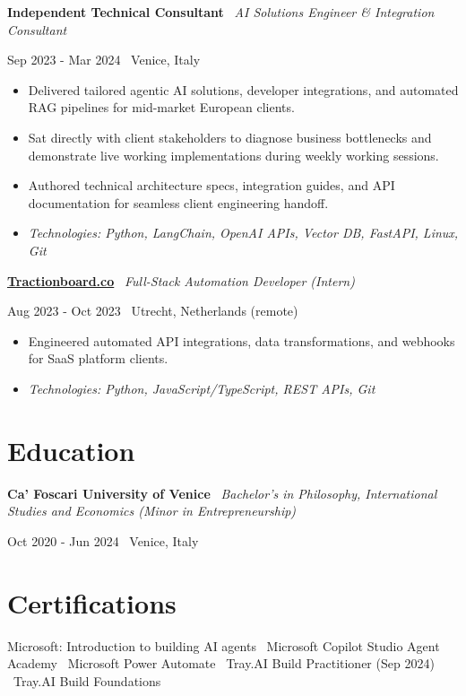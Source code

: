 \documentclass[a4paper,10pt]{article}
\newcommand{\role}[4]{%
  \vspace{2pt}\noindent
  \begin{minipage}[t]{0.70\textwidth}\raggedright\textbf{#1} \textbullet\ \textit{#3}\end{minipage}%
  \hfill
  \begin{minipage}[t]{0.28\textwidth}\raggedleft\footnotesize\color{gray}#2 \textbullet\ #4\end{minipage}%
  \vspace{1pt}%
}
\begin{document}
\role{Independent Technical Consultant}{Sep 2023 - Mar 2024}{AI Solutions Engineer \& Integration Consultant}{Venice, Italy}
\begin{itemize}
  \item Delivered tailored agentic AI solutions, developer integrations, and automated RAG pipelines for mid-market European clients.
  \item Sat directly with client stakeholders to diagnose business bottlenecks and demonstrate live working implementations during weekly working sessions.
  \item Authored technical architecture specs, integration guides, and API documentation for seamless client engineering handoff.
  \item \textit{Technologies: Python, LangChain, OpenAI APIs, Vector DB, FastAPI, Linux, Git}
\end{itemize}

\role{\href{https://tractionboard.co}{Tractionboard.co}}{Aug 2023 - Oct 2023}{Full-Stack Automation Developer (Intern)}{Utrecht, Netherlands (remote)}
\begin{itemize}
  \item Engineered automated API integrations, data transformations, and webhooks for SaaS platform clients.
  \item \textit{Technologies: Python, JavaScript/TypeScript, REST APIs, Git}
\end{itemize}

\section{Education}
\role{Ca' Foscari University of Venice}{Oct 2020 - Jun 2024}{Bachelor's in Philosophy, International Studies and Economics (Minor in Entrepreneurship)}{Venice, Italy}

\section{Certifications}
Microsoft: Introduction to building AI agents \textbullet\ Microsoft Copilot Studio Agent Academy \textbullet\ Microsoft Power Automate \textbullet\ Tray.AI Build Practitioner (Sep 2024) \textbullet\ Tray.AI Build Foundations

\end{document}
